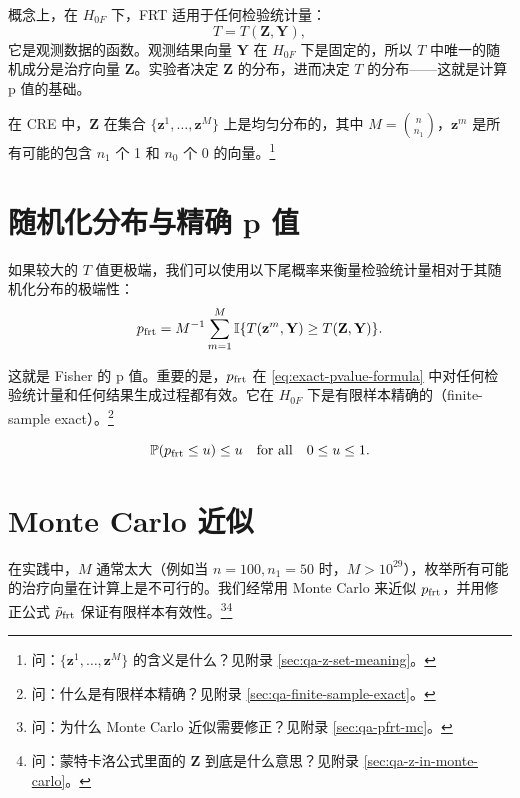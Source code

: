 概念上，在 $H_{0F}$ 下，FRT 适用于任何检验统计量：
\begin{equation}
T = T(\mathbf{Z}, \mathbf{Y}),
\label{eq:test-statistic}
\end{equation}
它是观测数据的函数。观测结果向量 $\mathbf{Y}$ 在 $H_{0F}$ 下是固定的，所以 $T$ 中唯一的随机成分是治疗向量 $\mathbf{Z}$。实验者决定 $\mathbf{Z}$ 的分布，进而决定 $T$ 的分布——这就是计算 p 值的基础。

在 CRE 中，$\mathbf{Z}$ 在集合 $\{\mathbf{z}^1, \ldots, \mathbf{z}^M\}$ 上是均匀分布的，其中 $M = \binom{n}{n_1}$，$\mathbf{z}^m$ 是所有可能的包含 $n_1$ 个 1 和 $n_0$ 个 0 的向量。\footnote{问：$\{\mathbf{z}^1, \ldots, \mathbf{z}^M\}$ 的含义是什么？见附录 \cref{sec:qa-z-set-meaning}。}

\section{随机化分布与精确 p 值}
\label{sec:exact-pvalue}

如果较大的 $T$ 值更极端，我们可以使用以下尾概率来衡量检验统计量相对于其随机化分布的极端性：
\begin{equation}
p_{\text{frt}} = M^{-1} \sum_{m=1}^M \mathbb{I}\{T(\mathbf{z}^m,\mathbf{Y}) \geq T(\mathbf{Z},\mathbf{Y})\}.
\label{eq:exact-pvalue-formula}
\end{equation}

这就是 Fisher 的 p 值。重要的是，$p_{\text{frt}}$ 在 \cref{eq:exact-pvalue-formula} 中对任何检验统计量和任何结果生成过程都有效。它在 $H_{0F}$ 下是有限样本精确的（finite-sample exact）。\footnote{问：什么是有限样本精确？见附录 \cref{sec:qa-finite-sample-exact}。}

\begin{equation}
\mathbb{P}(p_{\text{frt}} \leq u) \leq u \quad \text{for all} \quad 0 \leq u \leq 1.
\label{eq:p-value-valid}
\end{equation}


\section{Monte Carlo 近似}
\label{sec:mc-approximation}

在实践中，$M$ 通常太大（例如当 $n=100, n_1=50$ 时，$M > 10^{29}$），枚举所有可能的治疗向量在计算上是不可行的。我们经常用 Monte Carlo 来近似 $p_{\text{frt}}$，并用修正公式 $\tilde p_{\text{frt}}$ 保证有限样本有效性。\footnote{问：为什么 Monte Carlo 近似需要修正？见附录 \cref{sec:qa-pfrt-mc}。}\footnote{问：蒙特卡洛公式里面的 $\mathbf{Z}$ 到底是什么意思？见附录 \cref{sec:qa-z-in-monte-carlo}。}

